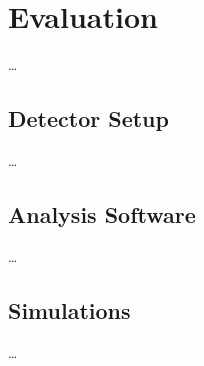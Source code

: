 
\chapter{Evaluation}
\label{ch:Evaluation}

\dots


\section{Detector Setup}
\label{ch:Evaluation:sec:Section1}

\dots


\section{Analysis Software}
\label{ch:Evaluation:sec:Section2}

\dots


\section{Simulations}
\label{ch:Evaluation:sec:Section3}

\dots
